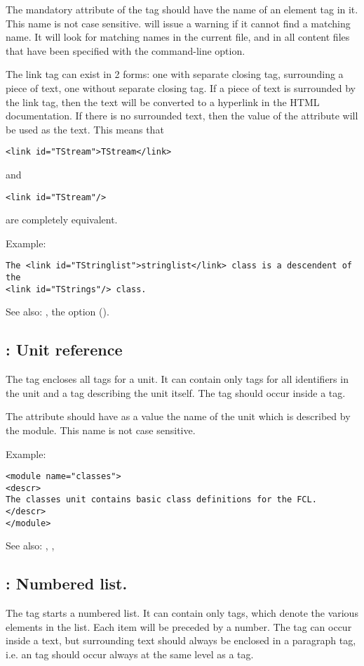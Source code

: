 The mandatory  attribute of the  tag should have the 
name of an element tag in it. This name is not case sensitive. \fpdoc
will issue a warning if it cannot find a matching name. It will look for
matching names in the current file, and in all content files that have been
specified with the  command-line option.

The link tag can exist in 2 forms: one with separate closing tag,
surrounding a piece of text, one without separate closing tag. If a piece of
text is surrounded by the link tag, then the text will be converted to a
hyperlink in the HTML documentation. If there is no surrounded text, then
the value of the  attribute will be used as the text. This means
that
\begin{verbatim}
<link id="TStream">TStream</link>
\end{verbatim}
and
\begin{verbatim}
<link id="TStream"/>
\end{verbatim}
are completely equivalent.

Example:
\begin{verbatim}
The <link id="TStringlist">stringlist</link> class is a descendent of the
<link id="TStrings"/> class.
\end{verbatim}

See also: , the  option ().

\subsection{ : Unit reference}
\label{tag:module}
The  tag encloses all  tags for a unit. It can
contain only  tags for all identifiers in the unit and 
a  tag describing the unit itself. The  tag should
occur inside a  tag.

The  attribute should have as a value the name of the unit which
is described by the module. This name is not case sensitive.

Example:
\begin{verbatim}
<module name="classes">
<descr>
The classes unit contains basic class definitions for the FCL.
</descr>
</module>
\end{verbatim}

See also: , , 

\subsection{ : Numbered list.}
\label{tag:ol}
The  tag starts a numbered list. It can contain only 
tags, which denote the various elements in the list. Each item will be
preceded by a number. The  tag can
occur inside a text, but surrounding text should always be enclosed in a
 paragraph tag, i.e. an  tag should occur always at the
same level as a  tag.

